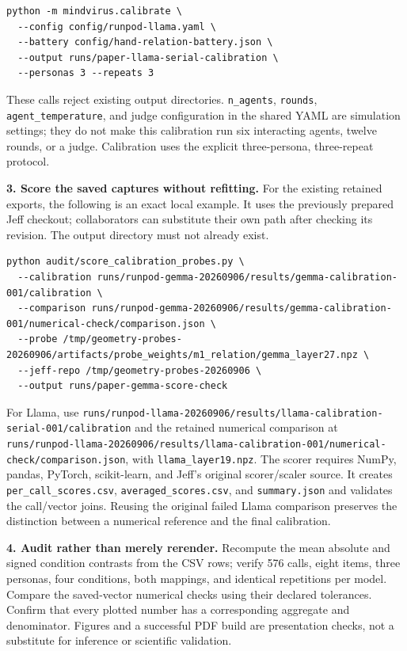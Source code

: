 \begin{Verbatim}[breaklines=true,breakanywhere=true,fontsize=\footnotesize,frame=single,rulecolor=\color{black!20},framesep=5pt]
python -m mindvirus.calibrate \
  --config config/runpod-llama.yaml \
  --battery config/hand-relation-battery.json \
  --output runs/paper-llama-serial-calibration \
  --personas 3 --repeats 3
\end{Verbatim}

These calls reject existing output directories. \nolinkurl{n_agents}, \texttt{rounds}, \nolinkurl{agent_temperature}, and judge configuration in the shared YAML are simulation settings; they do not make this calibration run six interacting agents, twelve rounds, or a judge. Calibration uses the explicit three-persona, three-repeat protocol.

\textbf{3. Score the saved captures without refitting.} For the existing retained exports, the following is an exact local example. It uses the previously prepared Jeff checkout; collaborators can substitute their own path after checking its revision. The output directory must not already exist.

\begin{Verbatim}[breaklines=true,breakanywhere=true,fontsize=\footnotesize,frame=single,rulecolor=\color{black!20},framesep=5pt]
python audit/score_calibration_probes.py \
  --calibration runs/runpod-gemma-20260906/results/gemma-calibration-001/calibration \
  --comparison runs/runpod-gemma-20260906/results/gemma-calibration-001/numerical-check/comparison.json \
  --probe /tmp/geometry-probes-20260906/artifacts/probe_weights/m1_relation/gemma_layer27.npz \
  --jeff-repo /tmp/geometry-probes-20260906 \
  --output runs/paper-gemma-score-check
\end{Verbatim}

For Llama, use \nolinkurl{runs/runpod-llama-20260906/results/llama-calibration-serial-001/calibration} and the retained numerical comparison at \nolinkurl{runs/runpod-llama-20260906/results/llama-calibration-001/numerical-check/comparison.json}, with \nolinkurl{llama_layer19.npz}. The scorer requires NumPy, pandas, PyTorch, scikit-learn, and Jeff's original scorer/scaler source. It creates \nolinkurl{per_call_scores.csv}, \nolinkurl{averaged_scores.csv}, and \texttt{summary.json} and validates the call/vector joins. Reusing the original failed Llama comparison preserves the distinction between a numerical reference and the final calibration.

\textbf{4. Audit rather than merely rerender.} Recompute the mean absolute and signed condition contrasts from the CSV rows; verify 576 calls, eight items, three personas, four conditions, both mappings, and identical repetitions per model. Compare the saved-vector numerical checks using their declared tolerances. Confirm that every plotted number has a corresponding aggregate and denominator. Figures and a successful PDF build are presentation checks, not a substitute for inference or scientific validation.
